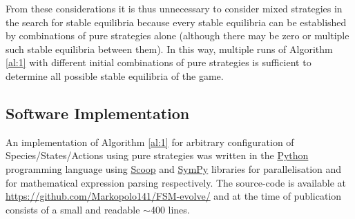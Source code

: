 From these considerations it is thus unnecessary to consider mixed strategies in the search for stable equilibria because every stable equilibria can be established by combinations of pure strategies alone (although there may be zero or multiple such stable equilibria between them).
In this way, multiple runs of Algorithm \ref{al:1} with different initial combinations of pure strategies is sufficient to determine all possible stable equilibria of the game.

\subsection{Software Implementation}\label{sec:implementation}
An implementation of Algorithm \ref{al:1} for arbitrary configuration of Species/States/Actions using pure strategies was written in the \href{https://www.python.org/}{Python} programming language using \href{http://pyscoop.org/}{Scoop} and \href{http://www.sympy.org/}{SymPy} libraries for parallelisation and for mathematical expression parsing respectively. The source-code is available at \href{https://github.com/Markopolo141/FSM-evolve/}{https://github.com/Markopolo141/FSM-evolve/} and at the time of publication consists of a small and readable $\sim$400 lines.

